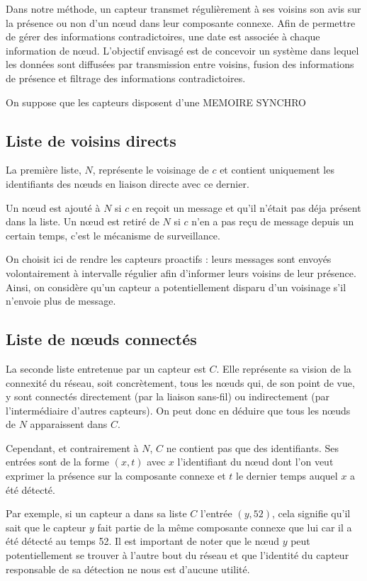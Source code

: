 \documentclass[10pt]{article}
\begin{document}
\begin{multicols}{2}
Dans notre méthode, un capteur transmet régulièrement à ses voisins
son avis sur la présence ou non d'un n\oe ud dans leur composante
connexe. Afin de permettre de gérer des informations contradictoires,
une date est associée à chaque information de n\oe ud. L'objectif
envisagé est de concevoir un système dans lequel les données sont
diffusées par transmission entre voisins, fusion des informations de
présence et filtrage des informations contradictoires.

On suppose que les capteurs disposent d'une MEMOIRE SYNCHRO

\subsection*{Liste de voisins directs}

La première liste, $N$, représente le voisinage de $c$ et contient
uniquement les identifiants des n\oe uds en liaison directe avec ce
dernier.

Un n\oe ud est ajouté à $N$ si $c$ en reçoit un message et qu'il
n'était pas déja présent dans la liste. Un n\oe ud est retiré de $N$
si $c$ n'en a pas reçu de message depuis un certain temps, c'est le
mécanisme de surveillance.

On choisit ici de rendre les capteurs proactifs : leurs messages sont
envoyés volontairement à intervalle régulier afin d'informer leurs
voisins de leur présence. Ainsi, on considère qu'un capteur a
potentiellement disparu d'un voisinage s'il n'envoie plus de message.

\subsection*{Liste de n\oe uds connectés}

La seconde liste entretenue par un capteur est $C$. Elle représente sa
vision de la connexité du réseau, soit concrètement, tous les n\oe uds
qui, de son point de vue, y sont connectés directement (par la liaison
sans-fil) ou indirectement (par l'intermédiaire d'autres capteurs). On
peut donc en déduire que tous les n\oe uds de $N$ apparaissent dans
$C$.

Cependant, et contrairement à $N$, $C$ ne contient pas que des
identifiants. Ses entrées sont de la forme $(x,t)$ avec $x$
l'identifiant du n\oe ud dont l'on veut exprimer la présence sur la
composante connexe et $t$ le dernier temps auquel $x$ a été détecté.

Par exemple, si un capteur a dans sa liste $C$ l'entrée $(y,52)$,
cela signifie qu'il sait que le capteur $y$ fait partie de la même
composante connexe que lui car il a été détecté au temps 52. Il est
important de noter que le n\oe ud $y$ peut potentiellement se trouver
à l'autre bout du réseau et que l'identité du capteur responsable de
sa détection ne nous est d'aucune utilité.


\end{multicols}
\end{document}
